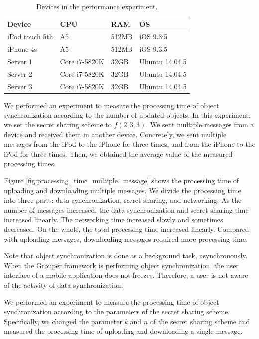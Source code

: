 \documentclass[a4paper,11pt]{report}
\begin{document}
\begin{table}[t]
	\centering  
	\begin{tabular}{llll}
		\toprule
		\textbf{Device} & \textbf{CPU} & \textbf{RAM} & \textbf{OS} \\ 
		\midrule
		iPod touch 5th & A5 & 512MB & iOS 9.3.5 \\
		iPhone 4s & A5 & 512MB & iOS 9.3.5 \\
		Server 1 & Core i7-5820K & 32GB & Ubuntu 14.04.5 \\
		Server 2 & Core i7-5820K & 32GB & Ubuntu 14.04.5 \\
		Server 3 & Core i7-5820K & 32GB & Ubuntu 14.04.5 \\ 
		\bottomrule
	\end{tabular}
	\caption{Devices in the performance experiment.}
	\label{table:experiment_devices}
\end{table}

We performed an experiment to measure the processing time of object synchronization according to the number of updated objects.
In this experiment, we set the secret sharing scheme to ${f(2, 3, 3)}$.
We sent multiple messages from a device and received them in another device. 
Concretely, we sent multiple messages from the iPod to the iPhone for three times, and from the iPhone to the iPod for three times.
Then, we obtained the average value of the measured processing times.

Figure \ref{fig:processing_time_multiple_message} shows the processing time of uploading and downloading multiple messages.
We divide the processing time into three parts: data synchronization, secret sharing, and networking.
As the number of messages increased, the data synchronization and secret sharing time increased linearly. 
The networking time increased slowly and sometimes decreased.
On the whole, the total processing time increased linearly.
Compared with uploading messages, downloading messages required more processing time.

Note that object synchronization is done as a background task, asynchronously.
When the Grouper framework is performing object synchronization, the user interface of a mobile application does not freezes.
Therefore, a user is not aware of the activity of data synchronization.

We performed an experiment to measure the processing time of object synchronization according to the parameters of the secret sharing scheme.
Specifically, we changed the parameter ${k}$ and ${n}$ of the secret sharing scheme and measured the processing time of uploading and downloading a single message.
\end{document}
